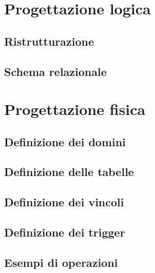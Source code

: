 \chapter{Progettazione logica}

\section{Ristrutturazione}

\section{Schema relazionale}

\chapter{Progettazione fisica}

\section{Definizione dei domini}

\section{Definizione delle tabelle}

\section{Definizione dei vincoli}

\section{Definizione dei trigger}

\section{Esempi di operazioni}